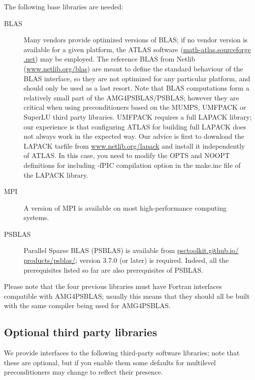 The following base libraries are needed:
\begin{description}
\item[BLAS] \cite{blas3,blas2,blas1} Many vendors provide optimized versions
  of BLAS; if no vendor version is
  available for a given platform, the ATLAS software
  (\href{http://math-atlas.sourceforge.net}{math-atlas.sourceforge .net})
  may be employed.  The reference BLAS from Netlib
  (\href{http://www.netlib.org/blas}{www.netlib.org/blas}) are meant to define the standard
  behaviour of the BLAS interface, so they are not optimized for any
  particular platform, and should only be used as a last
  resort. Note that BLAS computations form a relatively small part of
  the AMG4PSBLAS/PSBLAS; however they are critical when using
  preconditioners based on the MUMPS, UMFPACK or SuperLU third party
  libraries. UMFPACK requires a full LAPACK library; our
experience is that configuring ATLAS for building full LAPACK does not always
work in the expected way. Our advice is first to download the LAPACK tarfile from
\href{http://www.netlib.org/lapack}{www.netlib.org/lapack} and install it independently of ATLAS. In this case,
you need to modify the OPTS and NOOPT definitions for including -fPIC compilation option
in the make.inc file of the LAPACK library.
\item[MPI] \cite{MPI2,MPI1} A version of MPI is available on most
  high-performance computing systems.
 \item[PSBLAS] \cite{PSBLASGUIDE,psblas_00} Parallel Sparse BLAS (PSBLAS) is
  available from
  \href{https://psctoolkit.github.io/products/psblas/}{psctoolkit.github.io/
    products/psblas/}; version   3.7.0  (or later) is
  required. Indeed, all the prerequisites   listed so far are also
  prerequisites of PSBLAS. 
\end{description}
Please note that the four previous libraries must have Fortran
interfaces compatible with AMG4PSBLAS; usually this means that they
should all be built with the same compiler being used for  AMG4PSBLAS.

\subsection{Optional third party libraries\label{sec:third-party}}

We provide interfaces to the following third-party software libraries;
note that these are optional, but if you enable them some defaults
for multilevel preconditioners may change to reflect their presence.

